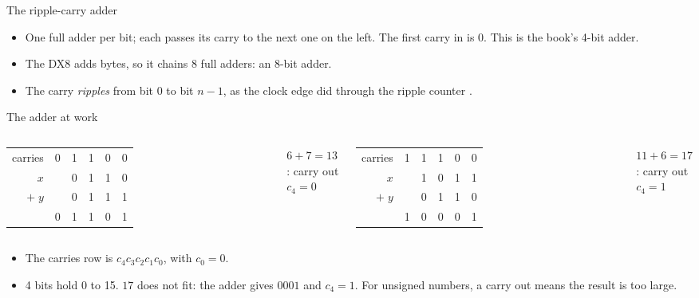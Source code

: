 \documentclass[10pt]{wosm-slides}
\makeatletter
\newcommand*\colsum[4]{%
  \begin{tabular}{@{}r@{\quad}*{5}{c@{\,}}@{}}
    {\scriptsize\color{wosm-brick}carries} & #1 \\
    $x$ & #2 \\
    $+\;y$ & #3 \\
    \midrule
    & #4 \\
  \end{tabular}}
\makeatother
\begin{document}
\begin{frame}{The ripple-carry adder}
  \begin{center}
  \end{center}

  \begin{itemize}
    \item One full adder per bit; each passes its carry to the next one on the left.
      The first carry in is 0. This is the book's 4-bit adder.
    \item The DX8 adds bytes, so it chains 8 full adders: an 8-bit adder.
    \item The carry \emph{ripples} from bit 0 to bit $n-1$, as the clock edge did
      through the ripple counter .
  \end{itemize}
\end{frame}

\begin{frame}{The adder at work}
  \begin{columns}[T, totalwidth=\textwidth]
      \centering
      \large
      \colsum{0 & 1 & 1 & 0 & 0}{ & 0 & 1 & 1 & 0}{ & 0 & 1 & 1 & 1}
        {0 & 1 & 1 & 0 & 1}\par\medskip
      \normalsize
      $6 + 7 = 13$: carry out $c_4 = 0$
      \centering
      \large
      \colsum{1 & 1 & 1 & 0 & 0}{ & 1 & 0 & 1 & 1}{ & 0 & 1 & 1 & 0}
        {1 & 0 & 0 & 0 & 1}\par\medskip
      \normalsize
      $11 + 6 = 17$: carry out $c_4 = 1$
  \end{columns}

  \bigskip
  \begin{itemize}
    \item The carries row is $c_4 c_3 c_2 c_1 c_0$, with $c_0 = 0$.
    \item 4 bits hold 0 to 15. $17$ does not fit: the adder gives $0001$ and
      $c_4 = 1$. For unsigned numbers, a carry out means the result is too large.
  \end{itemize}
\end{frame}
\end{document}
